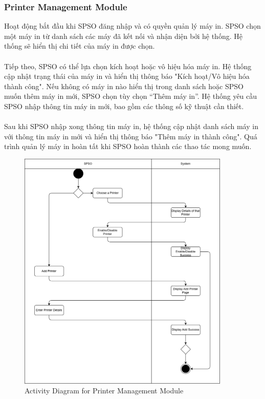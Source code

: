 \subsubsection{Printer Management Module}
Hoạt động bắt đầu khi SPSO đăng nhập và có quyền quản lý máy in. SPSO chọn một máy in từ danh sách các máy đã kết nối và nhận diện bởi hệ thống. Hệ thống sẽ hiển thị chi tiết của máy in được chọn.
\\ \\
Tiếp theo, SPSO có thể lựa chọn kích hoạt hoặc vô hiệu hóa máy in. Hệ thống cập nhật trạng thái của máy in và hiển thị thông báo "Kích hoạt/Vô hiệu hóa thành công". Nếu không có máy in nào hiển thị trong danh sách hoặc SPSO muốn thêm máy in mới, SPSO chọn tùy chọn “Thêm máy in”. Hệ thống yêu cầu SPSO nhập thông tin máy in mới, bao gồm các thông số kỹ thuật cần thiết.
\\ \\
Sau khi SPSO nhập xong thông tin máy in, hệ thống cập nhật danh sách máy in với thông tin máy in mới và hiển thị thông báo "Thêm máy in thành công". Quá trình quản lý máy in hoàn tất khi SPSO hoàn thành các thao tác mong muốn.
\begin{figure}[htbp]
    \centering
    \includegraphics[width=0.9\textwidth]{Images/Activity/Printer_management_activity.png}
    \caption{Activity Diagram for Printer Management Module}
\end{figure}

